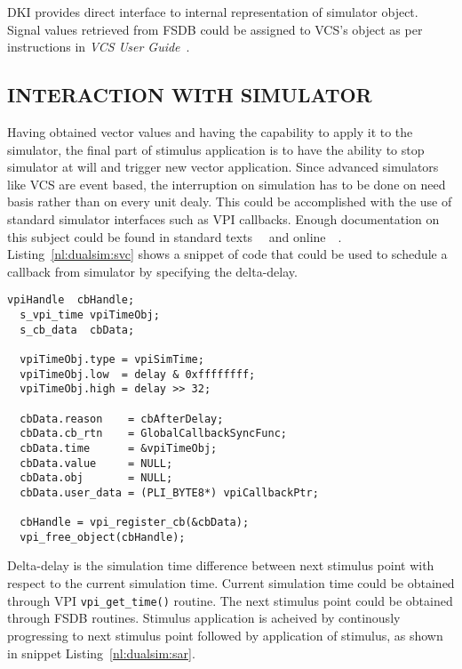 DKI provides direct interface to internal representation of simulator object. Signal values retrieved from FSDB could be assigned to VCS's object as per instructions in {\it VCS User Guide}~\citep[Section~C~Language~Interface$>$~Direct~C]{VCS:vcs.pdf}.

\subsection{INTERACTION WITH SIMULATOR}
Having obtained vector values and having the capability to apply it to the simulator, the final part of stimulus application is to have the ability to stop simulator at will and trigger new vector application. Since advanced simulators like VCS are event based, the interruption on simulation  has to be done on need basis rather than on every unit dealy. This could be accomplished with the use of standard simulator interfaces such as VPI callbacks. Enough documentation on this subject could be found in standard texts~\citep{ss:pli:1999}~\citep{sm:pli:1999} and online~\citep{wiki:2013:VPI}~\citep{aw:2013:VPI}. Listing~\ref{nl:dualsim:svc} shows a snippet of code that could be used to schedule a callback from simulator by specifying the delta-delay.

\lstset{language=C++,
basicstyle=\footnotesize,
frame=shadowbox,
breaklines=true}          
\begin{lstlisting}[frame=single, caption=Scheduling a VPI callback,label=nl:dualsim:svc] 
  vpiHandle  cbHandle;
  s_vpi_time vpiTimeObj;
  s_cb_data  cbData;

  vpiTimeObj.type = vpiSimTime;
  vpiTimeObj.low  = delay & 0xffffffff;
  vpiTimeObj.high = delay >> 32;

  cbData.reason    = cbAfterDelay;
  cbData.cb_rtn    = GlobalCallbackSyncFunc;
  cbData.time      = &vpiTimeObj;
  cbData.value     = NULL;
  cbData.obj       = NULL;
  cbData.user_data = (PLI_BYTE8*) vpiCallbackPtr;

  cbHandle = vpi_register_cb(&cbData);
  vpi_free_object(cbHandle);
\end{lstlisting}

Delta-delay is the simulation time difference between next stimulus point with respect to the current simulation time. Current simulation time could be obtained through VPI \verb|vpi_get_time()| routine. The next stimulus point could be obtained through FSDB routines. Stimulus application is acheived by continously progressing to next stimulus point followed by application of stimulus, as shown in snippet Listing~\ref{nl:dualsim:sar}.

